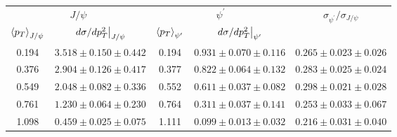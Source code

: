 \begin{tabular}{cc|cc|c}
\hline
\multicolumn{2}{c|}{$J/\psi$} &
  \multicolumn{2}{c|}{$\psi^{\prime}$} &
  \multirow{2}{*}{$\sigma_{\psi^\prime}/\sigma_{J/\psi}$} \\ \cline{1-4}
$\expval{p_T}_{J/\psi}$ &
  $\eval{d\sigma/dp^2_T}_{J/\psi}$ &
  $\expval{p_T}_{\psi^\prime}$ &
  $\eval{d\sigma/dp^2_T}_{\psi^\prime}$ &
   \\ \hline
\multicolumn{1}{c|}{0.194} &
  $3.518\pm0.150\pm0.442$ &
  \multicolumn{1}{c|}{0.194} &
  $0.931\pm0.070\pm0.116$ &
  $0.265\pm0.023\pm0.026$ \\
\multicolumn{1}{c|}{0.376} &
  $2.904\pm0.126\pm0.417$ &
  \multicolumn{1}{c|}{0.377} &
  $0.822\pm0.064\pm0.132$ &
  $0.283\pm0.025\pm0.024$ \\
\multicolumn{1}{c|}{0.549} &
  $2.048\pm0.082\pm0.336$ &
  \multicolumn{1}{c|}{0.552} &
  $0.611\pm0.037\pm0.082$ &
  $0.298\pm0.021\pm0.028$ \\
\multicolumn{1}{c|}{0.761} &
  $1.230\pm0.064\pm0.230$ &
  \multicolumn{1}{c|}{0.764} &
  $0.311\pm0.037\pm0.141$ &
  $0.253\pm0.033\pm0.067$ \\
\multicolumn{1}{c|}{1.098} &
  $0.459\pm0.025\pm0.075$ &
  \multicolumn{1}{c|}{1.111} &
  $0.099\pm0.013\pm0.032$ &
  $0.216\pm0.031\pm0.040$ \\ \hline
\end{tabular}
